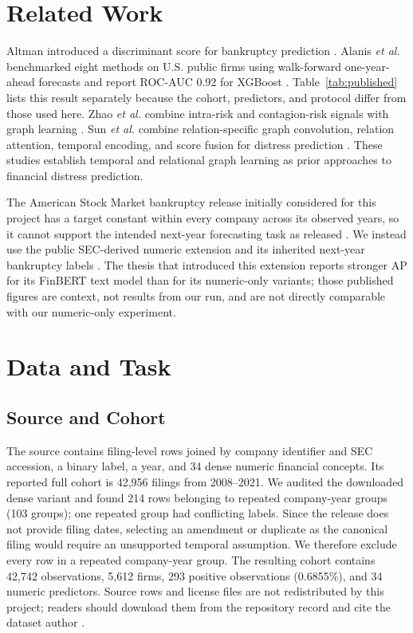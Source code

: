 \documentclass[conference]{IEEEtran}
\begin{document}
\section{Related Work}
Altman introduced a discriminant score for bankruptcy prediction \cite{altman1968}. Alanis \emph{et al.} benchmarked eight methods on U.S. public firms using walk-forward one-year-ahead forecasts and report ROC-AUC 0.92 for XGBoost \cite{alanis2022benchmark}. Table~\ref{tab:published} lists this result separately because the cohort, predictors, and protocol differ from those used here. Zhao \emph{et al.} combine intra-risk and contagion-risk signals with graph learning \cite{zhao2023comrisk}. Sun \emph{et al.} combine relation-specific graph convolution, relation attention, temporal encoding, and score fusion for distress prediction \cite{sun2026rahtgnn}. These studies establish temporal and relational graph learning as prior approaches to financial distress prediction.

The American Stock Market bankruptcy release initially considered for this project has a target constant within every company across its observed years, so it cannot support the intended next-year forecasting task as released \cite{lombardo2022}. We instead use the public SEC-derived numeric extension and its inherited next-year bankruptcy labels \cite{potiriadis2026}. The thesis that introduced this extension reports stronger AP for its FinBERT text model than for its numeric-only variants; those published figures are context, not results from our run, and are not directly comparable with our numeric-only experiment.

\section{Data and Task}
\subsection{Source and Cohort}
The source contains filing-level rows joined by company identifier and SEC accession, a binary label, a year, and 34 dense numeric financial concepts. Its reported full cohort is 42,956 filings from 2008--2021. We audited the downloaded dense variant and found 214 rows belonging to repeated company-year groups (103 groups); one repeated group had conflicting labels. Since the release does not provide filing dates, selecting an amendment or duplicate as the canonical filing would require an unsupported temporal assumption. We therefore exclude every row in a repeated company-year group. The resulting cohort contains 42,742 observations, 5,612 firms, 293 positive observations (0.6855\%), and 34 numeric predictors. Source rows and license files are not redistributed by this project; readers should download them from the repository record and cite the dataset author \cite{potiriadis2026}.
\end{document}
